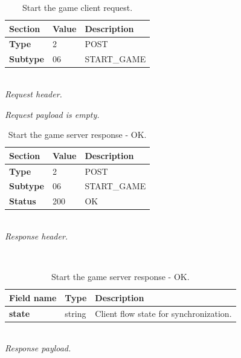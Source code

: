 \documentclass[english, sem, kiv, he, iso690alph, pdf, viewonly]{fasthesis}
\begin{document}
\begin{table}[h!]
	\centering
	\begin{minipage}[b]{0.45\textwidth}
		\centering
		\begin{tabular}{|l|l|l|}
			\hline
			\textbf{Section} & \textbf{Value} & \textbf{Description} \\ \hline
			\textbf{Type} & 2 & \footnotesize{POST} \\ \hline
			\textbf{Subtype} & 06 & \footnotesize{START\_GAME}  \\ \hline
		\end{tabular} \\
		\textit{Request header.}
	\end{minipage} 
	\hfill
	\begin{minipage}[b]{0.5\textwidth}
		\centering
		\textit{Request payload is empty.}
	\end{minipage}	
	\caption{Start the game client request.}
	\label{tab:start_game_request}
\end{table}

\begin{table}[h!]
	\centering
	\begin{minipage}[b]{1.0\textwidth}
		\centering
		\begin{tabular}{|l|l|l|}
			\hline
			\textbf{Section} & \textbf{Value} & \textbf{Description} \\ \hline
			\textbf{Type} & 2 & \footnotesize{POST} \\ \hline
			\textbf{Subtype} & 06 & \footnotesize{START\_GAME}  \\ \hline
			\textbf{Status} & 200 & \footnotesize{OK} \\ \hline
		\end{tabular} \\
		\textit{Response header.}
	\end{minipage} 
	\\
	\vspace{10pt}
	\begin{minipage}[b]{1.0\textwidth}
		\centering
		\begin{tabular}{|l|l|l|}
			\hline
			\textbf{Field name} & \textbf{Type} & \textbf{Description} \\ \hline
			\textbf{state} & string & Client flow state for synchronization. \\ \hline
		\end{tabular} \\
		\textit{Response payload.}
	\end{minipage}	
	\caption{Start the game server response - OK.}
	\label{tab:start_game_response_ok}
\end{table}
\end{document}

